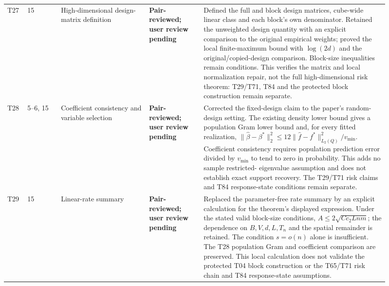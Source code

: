 \documentclass[10pt]{article}
\newcommand{\deferred}{\textcolor{deferredred}{\textbf{Deferred}}}
\newcommand{\pairreviewed}{\textcolor{deferredred}{\textbf{Pair-reviewed; user review pending}}}
\begin{document}
\begin{landscape}
\begin{longtable}{L{0.045\linewidth}L{0.08\linewidth}L{0.21\linewidth}L{0.13\linewidth}L{0.445\linewidth}}
T27 & 15 & High-dimensional design-matrix definition & \pairreviewed &
\textcolor{deferredred}{Defined the full and block design matrices, cube-wide
linear class and each block's own denominator. Retained the unweighted
design quantity with an explicit comparison to the original empirical
weights; proved the local finite-maximum bound with $\log(2d)$ and the
original/copied-design comparison. Block-size inequalities remain conditions.
This verifies the matrix and local normalization repair, not the full
high-dimensional risk theorem: T29/T71, T84 and the protected block
construction remain separate.}\\
T28 & 5--6, 15 & Coefficient consistency and variable selection &
\pairreviewed & \textcolor{deferredred}{Corrected the fixed-design claim to the
paper's random-design setting. The existing density lower bound gives a
population Gram lower bound and, for every fitted realization,
$\|\hat\beta-\beta^*\|_2^2\leq12\|\hat f-f^*\|_{L_2(Q)}^2/v_{\min}$.
Coefficient consistency requires population prediction error divided by
$v_{\min}$ to tend to zero in probability. This adds no sample restricted-
eigenvalue assumption and does not establish exact support recovery.
The T29/T71 risk claims and T84 response-state conditions remain separate.}\\
T29 & 15 & Linear-rate summary & \pairreviewed &
\textcolor{deferredred}{Replaced the parameter-free rate summary by an explicit
calculation for the theorem's displayed expression. Under the stated valid
block-size conditions, $A\leq2\sqrt{Cc_2Lnm}$; the dependence on $B,V,d,L,T_n$
and the spatial remainder is retained. The condition $s=o(n)$ alone is
insufficient. The T28 population Gram and coefficient comparison are preserved.
This local calculation does not validate the protected T04 block construction
or the T65/T71 risk chain and T84 response-state assumptions.}\\

\end{longtable}
\end{landscape}
\end{document}
